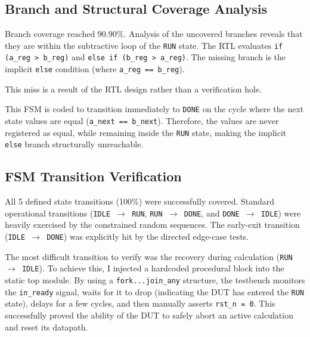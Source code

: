 \subsection{Branch and Structural Coverage Analysis}
Branch coverage reached 90.90\%. Analysis of the uncovered branches reveals that they are within the subtractive loop of the \texttt{RUN} state. The RTL evaluates \texttt{if (a\_reg > b\_reg)} and \texttt{else if (b\_reg > a\_reg)}. The missing branch is the implicit \texttt{else} condition (where \texttt{a\_reg == b\_reg}). 

This miss is a result of the RTL design rather than a verification hole.

This FSM is coded to transition immediately to \texttt{DONE} on the cycle where the next state values are equal (\texttt{a\_next == b\_next}). Therefore, the values are never registered as equal, while remaining inside the \texttt{RUN} state, making the implicit \texttt{else} branch structurally unreachable.

\subsection{FSM Transition Verification}
All 5 defined state transitions (100\%) were successfully covered. Standard operational transitions (\texttt{IDLE $\rightarrow$ RUN}, \texttt{RUN $\rightarrow$ DONE}, and \texttt{DONE $\rightarrow$ IDLE}) were heavily exercised by the constrained random sequences. The early-exit transition (\texttt{IDLE $\rightarrow$ DONE}) was explicitly hit by the directed edge-case tests.

The most difficult transition to verify was the recovery during calculation (\texttt{RUN $\rightarrow$ IDLE}). To achieve this, I injected a hardcoded procedural block into the static top module. By using a \texttt{fork...join\_any} structure, the testbench monitors the \texttt{in\_ready} signal, waits for it to drop (indicating the DUT has entered the \texttt{RUN} state), delays for a few cycles, and then manually asserts \texttt{rst\_n = 0}. This successfully proved the ability of the DUT to safely abort an active calculation and reset its datapath.

